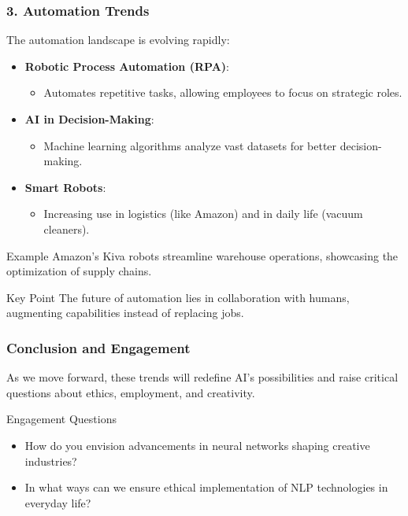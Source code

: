 \documentclass[aspectratio=169]{beamer}
\begin{document}
\begin{frame}[fragile]
    \frametitle{3. Automation Trends}
    The automation landscape is evolving rapidly:
    \begin{itemize}
        \item \textbf{Robotic Process Automation (RPA)}:
        \begin{itemize}
            \item Automates repetitive tasks, allowing employees to focus on strategic roles.
        \end{itemize}
        
        \item \textbf{AI in Decision-Making}:
        \begin{itemize}
            \item Machine learning algorithms analyze vast datasets for better decision-making.
        \end{itemize}
        
        \item \textbf{Smart Robots}:
        \begin{itemize}
            \item Increasing use in logistics (like Amazon) and in daily life (vacuum cleaners).
        \end{itemize}
    \end{itemize}
    \begin{block}{Example}
        Amazon’s Kiva robots streamline warehouse operations, showcasing the optimization of supply chains.
    \end{block}
    \begin{block}{Key Point}
        The future of automation lies in collaboration with humans, augmenting capabilities instead of replacing jobs.
    \end{block}
\end{frame}

\begin{frame}[fragile]
    \frametitle{Conclusion and Engagement}
    As we move forward, these trends will redefine AI's possibilities and raise critical questions about ethics, employment, and creativity.
    
    \begin{block}{Engagement Questions}
        \begin{itemize}
            \item How do you envision advancements in neural networks shaping creative industries?
            \item In what ways can we ensure ethical implementation of NLP technologies in everyday life?
        \end{itemize}
    \end{block}
\end{frame}
\end{document}
